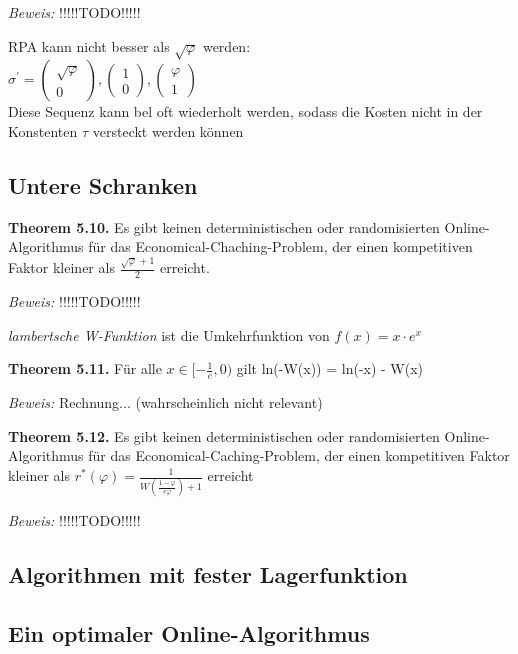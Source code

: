 \textit{Beweis:} !!!!!TODO!!!!!

RPA kann nicht besser als $\sqrt{\varphi}$ werden: \\
$\sigma^{'} = \left(\begin{array}{c} \sqrt{\varphi} \\ 0 \end{array}\right), \left(\begin{array}{c} 1 \\ 0 \end{array}\right), \left(\begin{array}{c} \varphi \\ 1 \end{array}\right)$ \\
Diese Sequenz kann bel oft wiederholt werden, sodass die Kosten nicht in der Konstenten $\tau$ versteckt werden können

\subsection{Untere Schranken}

\textbf{Theorem 5.10.} Es gibt keinen deterministischen oder randomisierten Online-Algorithmus für das Economical-Chaching-Problem, der einen kompetitiven Faktor kleiner als $\tfrac{\sqrt{\varphi} +1}{2}$ erreicht.

\textit{Beweis:} !!!!!TODO!!!!!

\textit{lambertsche W-Funktion} ist die Umkehrfunktion von $f(x) = x \cdot e^{x}$

\textbf{Theorem 5.11.} Für alle $x \in [-\tfrac{1}{e}, 0)$ gilt ln(-W(x)) = ln(-x) - W(x)

\textit{Beweis:} Rechnung... (wahrscheinlich nicht relevant)

\textbf{Theorem 5.12.} Es gibt keinen deterministischen oder randomisierten Online-Algorithmus für das Economical-Caching-Problem, der einen kompetitiven Faktor kleiner als $r^{*}(\varphi) = \tfrac{1}{W(\tfrac{1-\varphi}{e\varphi})+1}$ erreicht

\textit{Beweis:} !!!!!TODO!!!!!

\subsection{Algorithmen mit fester Lagerfunktion}

\subsection{Ein optimaler Online-Algorithmus}
